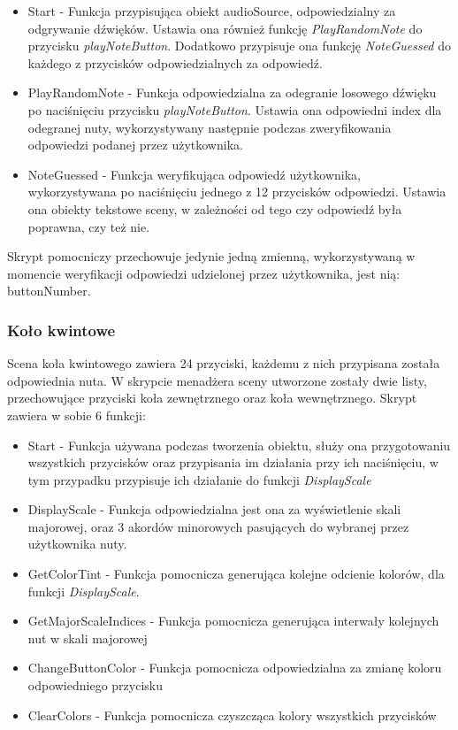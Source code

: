 \begin{itemize}
    \item Start - Funkcja przypisująca obiekt audioSource, odpowiedzialny za odgrywanie dźwięków. Ustawia ona również funkcję \emph{PlayRandomNote} do przycisku \emph{playNoteButton}. Dodatkowo przypisuje ona funkcję \emph{NoteGuessed} do każdego z przycisków odpowiedzialnych za odpowiedź.
    \item PlayRandomNote - Funkcja odpowiedzialna za odegranie losowego dźwięku po naciśnięciu przycisku \emph{playNoteButton}. Ustawia ona odpowiedni index dla odegranej nuty, wykorzystywany następnie podczas zweryfikowania odpowiedzi podanej przez użytkownika.
    \item NoteGuessed - Funkcja weryfikująca odpowiedź użytkownika, wykorzystywana po naciśnięciu jednego z 12 przycisków odpowiedzi. Ustawia ona obiekty tekstowe sceny, w zależności od tego czy odpowiedź była poprawna, czy też nie. 
\end{itemize}

Skrypt pomocniczy przechowuje jedynie jedną zmienną, wykorzystywaną w momencie weryfikacji odpowiedzi udzielonej przez użytkownika, jest nią: buttonNumber.

\subsubsection{Koło kwintowe}

Scena koła kwintowego zawiera 24 przyciski, każdemu z nich przypisana została odpowiednia nuta. W skrypcie menadżera sceny utworzone zostały dwie listy, przechowujące przyciski koła zewnętrznego oraz koła wewnętrznego. Skrypt zawiera w sobie 6 funkcji:

\begin{itemize}
\item Start - Funkcja używana podczas tworzenia obiektu, służy ona przygotowaniu wszystkich przycisków oraz przypisania im działania przy ich naciśnięciu, w tym przypadku przypisuje ich działanie do funkcji \emph{DisplayScale}
\item DisplayScale - Funkcja odpowiedzialna jest ona za wyświetlenie skali majorowej, oraz 3 akordów minorowych pasujących do wybranej przez użytkownika nuty. 
\item GetColorTint - Funkcja pomocnicza generująca kolejne odcienie kolorów, dla funkcji \emph{DisplayScale}. 
\item GetMajorScaleIndices - Funkcja pomocnicza generująca interwały kolejnych nut w skali majorowej
\item ChangeButtonColor - Funkcja pomocnicza odpowiedzialna za zmianę koloru odpowiedniego przycisku
\item ClearColors - Funkcja pomocnicza czyszcząca kolory wszystkich przycisków
\end{itemize}

